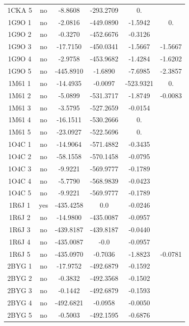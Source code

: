 \begin{table}[h]
\begin{tabular}{|c|c|c|c|c|c|}
        1CKA 5 & no & -8.8608    &    -293.2709 & 0. & \\                    
        1G9O 1 & no & -2.0816    &    -449.0890 & -1.5942 & 0. \\               
        1G9O 2 & no & -0.3270    &    -452.6676 & -0.3126 & \\          
        1G9O 3 & no & -17.7150   &    -450.0341 & -1.5667 & -1.5667 \\         
        1G9O 4 & no & -2.9758    &    -453.9682 & -1.4284 & -1.6202 \\          
        1G9O 5 & no & -445.8910  &    -1.6890 & -7.6985 & -2.3857 \\          
        1M61 1 & no & -14.4935   &    -0.0097 & -523.9321 & 0. \\            
        1M61 2 & no & -5.0899    &    -531.3717 & -1.8749 & -0.0083 \\         
        1M61 3 & no & -3.5795    &    -527.2659 & -0.0154 & \\           
        1M61 4 & no & -16.1511   &    -530.2666 & 0. & \\              
        1M61 5 & no & -23.0927   &    -522.5696 & 0. & \\                 
        1O4C 1 & no & -14.9064   &    -571.4882 & -0.3435 & \\         
        1O4C 2 & no & -58.1558   &    -570.1458 & -0.0795 & \\         
        1O4C 3 & no & -9.9221    &    -569.9777 & -0.1789 & \\          
        1O4C 4 & no & -5.7790    &    -568.9839 & -0.0423 & \\          
        1O4C 5 & no & -9.9221    &    -569.9777 & -0.1789 & \\          
        1R6J 1 & yes& -435.4258  &     0.0 & -0.0246 & \\               
        1R6J 2 & no & -14.9800   &    -435.0087 & -0.0957 & \\         
        1R6J 3 & no & -439.8187  &    -439.8187 & -0.0440 & \\               
        1R6J 4 & no &  -435.0087  &    -0.0 & -0.0957 & \\               
        1R6J 5 & no & -435.0970  &    -0.7036 & -1.8823 & -0.0781 \\          
        2BYG 1 & no & -17.9752   &    -492.6879 & -0.1592 & \\         
        2BYG 2 & no & -0.3832    &    -492.3568 & -0.1502 & \\          
        2BYG 3 & no & -0.1442    &    -492.6879 & -0.1593 & \\          
        2BYG 4 & no & -492.6821 &    -0.0958 & -0.0050 & \\          
        2BYG 5 & no & -0.5003    &   -492.1595 & -0.6876 & \\           
    
    \hline


 \end{tabular}      
 \label{tab_echec_30}      
\end{table}


